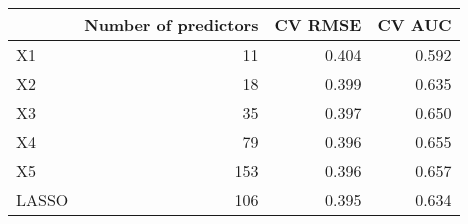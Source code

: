 
\begin{tabular}{lrrr}
\toprule
  & Number of predictors & CV RMSE & CV AUC\\
\midrule
X1 & 11 & 0.404 & 0.592\\
X2 & 18 & 0.399 & 0.635\\
X3 & 35 & 0.397 & 0.650\\
X4 & 79 & 0.396 & 0.655\\
X5 & 153 & 0.396 & 0.657\\
LASSO & 106 & 0.395 & 0.634\\
\bottomrule
\end{tabular}